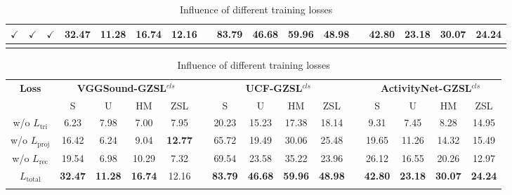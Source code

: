 \documentclass[lettersize,journal]{IEEEtran}
\begin{document}
\begin{table}[!t]
\begin{tabular}{ccc cccc c cccc c cccc}
    \noalign{\global\setlength{\oldaboverulesep}{\aboverulesep}}
    \noalign{\global\setlength{\oldbelowrulesep}{\belowrulesep}}
    \noalign{\global\setlength{\aboverulesep}{0pt}}
    \noalign{\global\setlength{\belowrulesep}{1.5pt}}
    \midrule[1pt]
    \rowcolor{gray!25}
    \textbf{$\checkmark$} & \textbf{$\checkmark$} & \textbf{$\checkmark$} & \textbf{32.47} & \textbf{11.28} & \textbf{16.74} & \textbf{12.16} & & \textbf{83.79} & 46.68 & \textbf{59.96} & \textbf{48.98} & & \textbf{42.80} & \textbf{23.18} & \textbf{30.07} & 24.24 \\
    \bottomrule[2pt]
    \noalign{\global\setlength{\aboverulesep}{\oldaboverulesep}}
    \noalign{\global\setlength{\belowrulesep}{\oldbelowrulesep}}
  \end{tabular}
  \par\vspace{\dblfloatsep}
  \caption{Influence of different training losses}
  \label{tab:loss_ablation}
  \begin{tabular}{c cccc c cccc c cccc}
    \toprule[2pt]
    \multirow{2}{*}{\textbf{Loss}} 
    & \multicolumn{4}{c}{\textbf{VGGSound-GZSL}$^{\textit{cls}}$} & & \multicolumn{4}{c}{\textbf{UCF-GZSL}$^{\textit{cls}}$} & & \multicolumn{4}{c}{\textbf{ActivityNet-GZSL}$^{\textit{cls}}$} \\
    \cmidrule(lr){2-5} \cmidrule(lr){7-10} \cmidrule(lr){12-15}
    & S & U & HM & ZSL & & S & U & HM & ZSL & & S & U & HM & ZSL \\
    \midrule[1pt]
    w/o $L_{\mathrm{tri}}$ & 6.23 & 7.98 & 7.00 & 7.95 & & 20.23 & 15.23 & 17.38 & 18.14 & & 9.31 & 7.45 & 8.28 & 14.95 \\
    w/o $L_{\mathrm{proj}}$ & 16.42 & 6.24 & 9.04 & \textbf{12.77} & & 65.72 & 19.49 & 30.06 & 25.48 & & 19.65 & 11.26 & 14.32 & 15.49 \\
    w/o $L_{\mathrm{rec}}$ & 19.54 & 6.98 & 10.29 & 7.32 & & 69.54 & 23.58 & 35.22 & 23.96 & & 26.12 & 16.55 & 20.26 & 12.97 \\
    
    \noalign{\global\setlength{\oldaboverulesep}{\aboverulesep}}
    \noalign{\global\setlength{\oldbelowrulesep}{\belowrulesep}}
    \noalign{\global\setlength{\aboverulesep}{0pt}}
    \noalign{\global\setlength{\belowrulesep}{1.5pt}}
    \midrule[1pt]
    \rowcolor{gray!25}
    \textbf{$L_{\mathrm{total}}$} & \textbf{32.47} & \textbf{11.28} & \textbf{16.74} & 12.16 & & \textbf{83.79} & \textbf{46.68} & \textbf{59.96} & \textbf{48.98} & & \textbf{42.80} & \textbf{23.18} & \textbf{30.07} & \textbf{24.24} \\
    \bottomrule[2pt]
    \noalign{\global\setlength{\aboverulesep}{\oldaboverulesep}}
    \noalign{\global\setlength{\belowrulesep}{\oldbelowrulesep}}
  \end{tabular}
\end{table}
\end{document}
